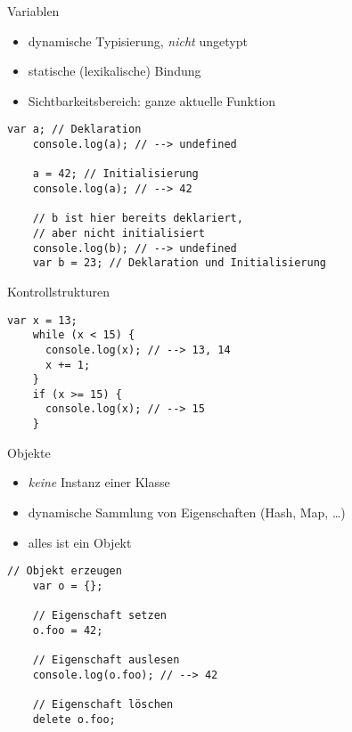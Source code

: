 \begin{frame}[fragile]{Variablen}
  \begin{itemize}
    \item dynamische Typisierung, \emph{nicht} ungetypt
    \item statische (lexikalische) Bindung
    \item Sichtbarkeitsbereich: ganze aktuelle Funktion
  \end{itemize}
  
  \begin{lstlisting}[gobble=4]
    var a; // Deklaration
    console.log(a); // --> undefined
    
    a = 42; // Initialisierung
    console.log(a); // --> 42
    
    // b ist hier bereits deklariert,
    // aber nicht initialisiert
    console.log(b); // --> undefined
    var b = 23; // Deklaration und Initialisierung
  \end{lstlisting}  
\end{frame}

\begin{frame}[fragile]{Kontrollstrukturen}
  \begin{lstlisting}[gobble=4]
    var x = 13;
    while (x < 15) {
      console.log(x); // --> 13, 14
      x += 1;
    }
    if (x >= 15) {
      console.log(x); // --> 15
    }
  \end{lstlisting}
\end{frame}

\begin{frame}[fragile]{Objekte}
  \begin{itemize}
    \item \emph{keine} Instanz einer Klasse
    \item dynamische Sammlung von Eigenschaften (Hash, Map, \ldots)
    \item alles ist ein Objekt
  \end{itemize}
    
  \begin{lstlisting}[gobble=4]
    // Objekt erzeugen
    var o = {};
    
    // Eigenschaft setzen
    o.foo = 42;
    
    // Eigenschaft auslesen
    console.log(o.foo); // --> 42
    
    // Eigenschaft löschen
    delete o.foo;
  \end{lstlisting}  
\end{frame}


